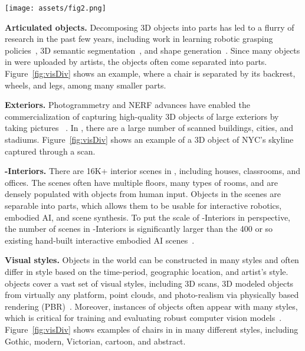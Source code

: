 \begin{figure*}[b!]
    \texttt{[image: assets/fig2.png]}
    \caption{Highlights of the visual diversity of objects that appear in \data, including animated objects, rigged (body-part annotated) characters, models separatable into parts, exterior environments, interior environments, and a wide range visual styles.}
    \label{fig:visDiv}
    \vspace{-1em}
\end{figure*}

\textbf{Articulated objects.} Decomposing 3D objects into parts has led to a flurry of research in the past few years, including work in learning robotic grasping policies~\cite{xu2021adagrasp,xiang2020sapien}, 3D semantic segmentation~\cite{mo2019partnet}, and shape generation~\cite{mo2019structurenet}. Since many objects in \data were uploaded by artists, the objects often come separated into parts. Figure~\ref{fig:visDiv} shows an example, where a chair is separated by its backrest, wheels, and legs, among many smaller parts.

\textbf{Exteriors.} Photogrammetry and NERF advances have enabled the commercialization of capturing high-quality 3D objects of large exteriors by taking pictures ~\cite{tancik2022block,xiangli2022bungeenerf}. In \data, there are a large number of scanned buildings, cities, and stadiums. Figure~\ref{fig:visDiv} shows an example of a 3D object of NYC's skyline captured through a scan.

\textbf{\data-Interiors.} There are 16K+ interior scenes in \data, including houses, classrooms, and offices. The scenes often have multiple floors, many types of rooms, and are densely populated with objects from human input. Objects in the scenes are separable into parts, which allows them to be usable for interactive robotics, embodied AI, and scene synthesis. To put the scale of \data-Interiors in perspective, the number of scenes in \data-Interiors is significantly larger than the 400 or so existing hand-built interactive embodied AI scenes~\cite{kolve2017ai2thor,gan2020threedworld,li2021igibson,szot2021habitat}.

\textbf{Visual styles.} Objects in the world can be constructed in many styles and often differ in style based on the time-period, geographic location, and artist's style. \data objects cover a vast set of visual styles, including 3D scans, 3D modeled objects from virtually any platform, point clouds, and photo-realism via physically based rendering (PBR)~\cite{pharr2016physically}.
Moreover, instances of objects often appear with many styles, which is critical for training and evaluating robust computer vision models~\cite{radford2021learning}. Figure~\ref{fig:visDiv} shows examples of chairs in \data in many different styles, including Gothic, modern, Victorian, cartoon, and abstract.

